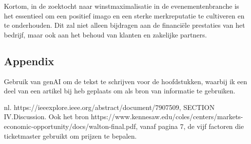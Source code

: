 \vspace{5 mm}
Kortom, in de zoektocht naar winstmaximalisatie in de evenementenbranche is het essentieel om een positief imago en een sterke merkreputatie te cultiveren en te onderhouden. Dit zal niet alleen bijdragen aan de financiële prestaties van het bedrijf, maar ook aan het behoud van klanten en zakelijke partners.

\subsection{Appendix}
Gebruik van genAI om de tekst te schrijven voor de hoofdstukken, waarbij ik een deel van een artikel bij heb geplaats om als bron van informatie te gebruiken. 

nl. https://ieeexplore.ieee.org/abstract/document/7907509, SECTION IV.Discussion.
Ook het bron https://www.kennesaw.edu/coles/centers/markets-economic-opportunity/docs/walton-final.pdf, vanaf pagina 7, de vijf factoren die ticketmaster gebruikt om prijzen te bepalen.
